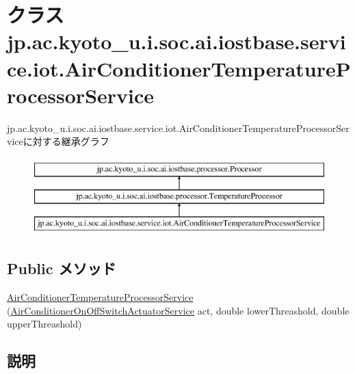 \hypertarget{classjp_1_1ac_1_1kyoto__u_1_1i_1_1soc_1_1ai_1_1iostbase_1_1service_1_1iot_1_1_air_conditioner_temperature_processor_service}{\section{クラス jp.\-ac.\-kyoto\-\_\-u.\-i.\-soc.\-ai.\-iostbase.\-service.\-iot.\-Air\-Conditioner\-Temperature\-Processor\-Service}
\label{classjp_1_1ac_1_1kyoto__u_1_1i_1_1soc_1_1ai_1_1iostbase_1_1service_1_1iot_1_1_air_conditioner_temperature_processor_service}
}
jp.\-ac.\-kyoto\-\_\-u.\-i.\-soc.\-ai.\-iostbase.\-service.\-iot.\-Air\-Conditioner\-Temperature\-Processor\-Serviceに対する継承グラフ\begin{figure}[H]
\begin{center}
\leavevmode
\includegraphics[height=3.000000cm]{classjp_1_1ac_1_1kyoto__u_1_1i_1_1soc_1_1ai_1_1iostbase_1_1service_1_1iot_1_1_air_conditioner_temperature_processor_service}
\end{center}
\end{figure}
\subsection*{Public メソッド}
\begin{DoxyCompactItemize}
\item 
\hyperlink{classjp_1_1ac_1_1kyoto__u_1_1i_1_1soc_1_1ai_1_1iostbase_1_1service_1_1iot_1_1_air_conditioner_temperature_processor_service_a988335d54b252c8372674d22a333b913}{Air\-Conditioner\-Temperature\-Processor\-Service} (\hyperlink{classjp_1_1ac_1_1kyoto__u_1_1i_1_1soc_1_1ai_1_1iostbase_1_1service_1_1iot_1_1_air_conditioner_on_off_switch_actuator_service}{Air\-Conditioner\-On\-Off\-Switch\-Actuator\-Service} act, double lower\-Threashold, double upper\-Threashold)
\end{DoxyCompactItemize}


\subsection{説明}



